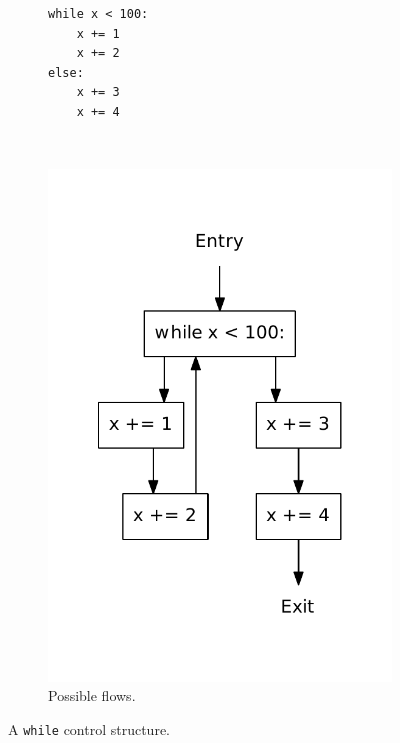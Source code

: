 \begin{figure}[H]
  \centering
  \begin{subfigure}[b]{0.4\textwidth}
    \begin{lstlisting}[style=python, caption={Code example.}, label={python:while:else:code}]
while x < 100:
    x += 1
    x += 2
else:
    x += 3
    x += 4
    \end{lstlisting}
  \end{subfigure}
  ~ %
  \begin{subfigure}[b]{0.4\textwidth}
    \centering
    \includegraphics[scale=.4]{./figures/while_else.pdf}
    \caption{Possible flows.}
    \label{python:while:else:flow}
  \end{subfigure}
  \caption{A \texttt{while} control structure.}
  \label{python:while:else}
\end{figure}


